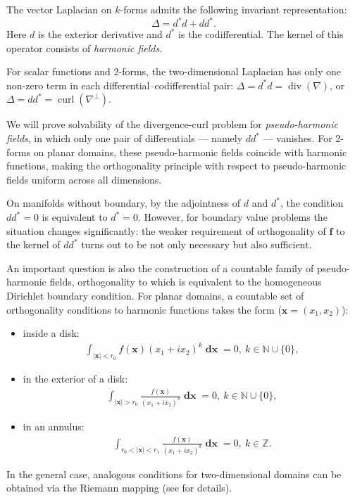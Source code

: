 \documentclass[a4paper]{article}
\newcommand{\N}{\mathbb{N}}
\newcommand{\Z}{\mathbb{Z}}
\newcommand{\bx}{\mathbf{x}}
\newcommand{\bff}{\mathbf{f}}
\newcommand{\dx}{\operatorname{\mathbf{dx}}}
\newcommand{\curl}{\operatorname{curl}}
\newcommand{\divv}{\operatorname{div}}
\begin{document}
The vector Laplacian on $k$-forms admits the following invariant representation:
$$
\Delta = d^*d + dd^*.
$$
Here $d$ is the exterior derivative and $d^*$ is the codifferential. The kernel of this operator consists of {\it harmonic fields}.

For scalar functions and 2-forms, the two-dimensional Laplacian has only one non-zero term in each differential--codifferential pair:
$\Delta = d^*d = \divv(\nabla)$, or $\Delta = dd^* = \curl(\nabla^\perp)$.

We will prove solvability of the divergence-curl problem for {\it pseudo-harmonic fields}, in which only one pair of differentials --- namely $dd^*$ --- vanishes. For 2-forms on planar domains, these pseudo-harmonic fields coincide with harmonic functions, making the orthogonality principle with respect to pseudo-harmonic fields uniform across all dimensions.

On manifolds without boundary, by the adjointness of $d$ and $d^*$, the condition $dd^* = 0$ is equivalent to $d^* = 0$. However, for boundary value problems the situation changes significantly: the weaker requirement of orthogonality of $\bff$ to the kernel of $dd^*$ turns out to be not only necessary but also sufficient.

An important question is also the construction of a countable family of pseudo-harmonic fields, orthogonality to which is equivalent to the homogeneous Dirichlet boundary condition. For planar domains, a countable set of orthogonality conditions to harmonic functions takes the form ($\bx=(x_1,x_2)$):
\begin{itemize}
\item inside a disk:
\begin{align*}
\int_{|\bx|<r_0} f(\bx)(x_1+ix_2)^k \dx = 0,~k\in \N \cup \{0\},
\end{align*}

\item in the exterior of a disk:
\begin{align*}
\int_{|\bx|>r_0} \frac {f(\bx)}{(x_1+ix_2)^k} \dx = 0,~k\in \N \cup \{0\},
\end{align*}

\item in an annulus:
\begin{align*}
\int_{r_0<|\bx|<r_1} \frac {f(\bx)}{(x_1+ix_2)^k} \dx = 0,~k\in \Z.
\end{align*}
\end{itemize}
In the general case, analogous conditions for two-dimensional domains can be obtained via the Riemann mapping (see \cite{G1} for details).
\end{document}
